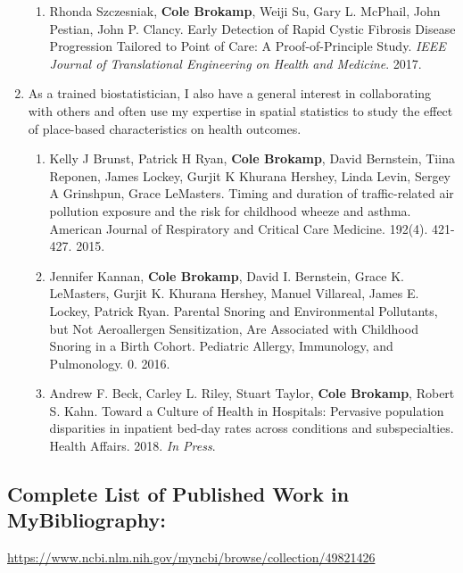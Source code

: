 \documentclass{nihbiosketch}
\begin{document}
\begin{enumerate}
\begin{enumerate}
	\item Rhonda Szczesniak, \textbf{Cole Brokamp}, Weiji Su, Gary L. McPhail,
	John Pestian, John P. Clancy. Early Detection of Rapid Cystic Fibrosis
	Disease Progression Tailored to Point of Care: A Proof-of-Principle
	Study. \emph{IEEE Journal of Translational Engineering on Health and Medicine}. 2017.

\end{enumerate}

\item As a trained biostatistician, I also have a general interest in collaborating with others and often use my expertise in spatial statistics to study the effect of place-based characteristics on health outcomes.

\begin{enumerate}

	\item Kelly J Brunst, Patrick H Ryan, \textbf{Cole Brokamp}, David Bernstein, Tiina Reponen, James Lockey, Gurjit K Khurana Hershey, Linda Levin, Sergey A Grinshpun, Grace LeMasters. Timing and duration of traffic-related air pollution exposure and the risk for childhood wheeze and asthma. American Journal of Respiratory and Critical Care Medicine. 192(4). 421-427. 2015.

	\item Jennifer Kannan, \textbf{Cole Brokamp}, David I. Bernstein, Grace K. LeMasters, Gurjit K. Khurana Hershey, Manuel Villareal, James E. Lockey, Patrick Ryan. Parental Snoring and Environmental Pollutants, but Not Aeroallergen Sensitization, Are Associated with Childhood Snoring in a Birth Cohort. Pediatric Allergy, Immunology, and Pulmonology. 0. 2016.
	
	\item Andrew F. Beck, Carley L. Riley, Stuart Taylor, \textbf{Cole Brokamp}, Robert S. Kahn. Toward a Culture of Health in Hospitals: Pervasive population disparities in inpatient bed-day rates across conditions and subspecialties. Health Affairs. 2018. \emph{In Press}.

\end{enumerate}

\end{enumerate}

\subsection*{Complete List of Published Work in MyBibliography:} 
\url{https://www.ncbi.nlm.nih.gov/myncbi/browse/collection/49821426}
\end{document}
